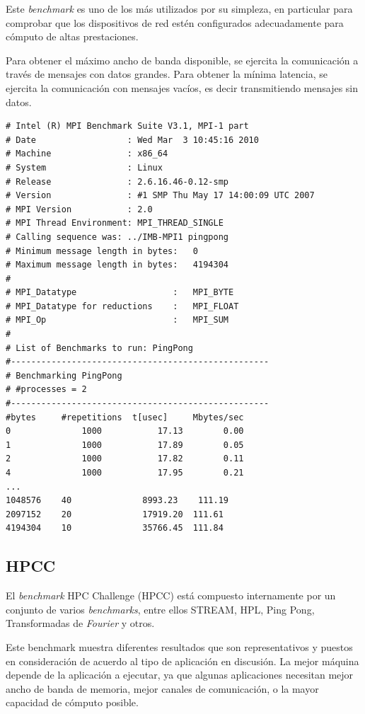 \documentclass[a4paper]{report}
\begin{document}
\bigskip

Este {\it benchmark} es uno de los m\'as utilizados por su simpleza, 
en particular para comprobar que los dispositivos de red est\'en configurados adecuadamente para c\'omputo
de altas prestaciones.

\bigskip

Para obtener el m\'aximo ancho de banda disponible, se ejercita la comunicaci\'on a trav\'es de mensajes con datos grandes.
Para obtener la m\'inima latencia, se ejercita la comunicaci\'on con mensajes vac\'ios, es decir transmitiendo mensajes sin datos.

\begin{verbatim}
# Intel (R) MPI Benchmark Suite V3.1, MPI-1 part
# Date                  : Wed Mar  3 10:45:16 2010
# Machine               : x86_64
# System                : Linux
# Release               : 2.6.16.46-0.12-smp
# Version               : #1 SMP Thu May 17 14:00:09 UTC 2007
# MPI Version           : 2.0
# MPI Thread Environment: MPI_THREAD_SINGLE
# Calling sequence was: ../IMB-MPI1 pingpong
# Minimum message length in bytes:   0
# Maximum message length in bytes:   4194304
#
# MPI_Datatype                   :   MPI_BYTE
# MPI_Datatype for reductions    :   MPI_FLOAT
# MPI_Op                         :   MPI_SUM
#
# List of Benchmarks to run: PingPong
#---------------------------------------------------
# Benchmarking PingPong
# #processes = 2
#---------------------------------------------------
#bytes     #repetitions  t[usec]     Mbytes/sec
0              1000           17.13        0.00
1              1000           17.89        0.05
2              1000           17.82        0.11
4              1000           17.95        0.21
...
1048576    40              8993.23    111.19
2097152    20              17919.20  111.61
4194304    10              35766.45  111.84
\end{verbatim}

\subsection{HPCC}

El {\it benchmark} HPC Challenge \cite{hpcc} (HPCC) est\'a compuesto internamente por un conjunto de
varios {\it benchmarks}, entre ellos STREAM, HPL, Ping Pong, Transformadas de {\it Fourier}
y otros.

\bigskip

Este benchmark muestra diferentes resultados que son representativos
y puestos en consideraci\'on de acuerdo al tipo de aplicaci\'on en discusi\'on.
La mejor m\'aquina depende de la aplicaci\'on a ejecutar, ya que algunas aplicaciones
necesitan mejor ancho de banda de memoria, mejor canales de comunicaci\'on, o
la mayor capacidad de c\'omputo posible.
\end{document}
